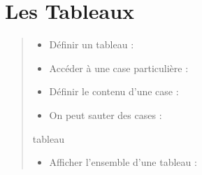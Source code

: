 \documentclass[letterpaper,10pt,french]{sphinxmanual}
\begin{document}
\section{Les Tableaux}
\label{\detokenize{21-scripts-shell:les-tableaux}}\begin{quote}
\begin{itemize}
\item {} \begin{description}
\item[{Définir un tableau :}] \leavevmode
{}

\end{description}

\item {} \begin{description}
\item[{Accéder à une case particulière :}] \leavevmode
{}

\end{description}

\item {} \begin{description}
\item[{Définir le contenu d’une case :}] \leavevmode
{}

\end{description}

\item {} 
On peut sauter des cases :

\end{itemize}

%
\begin{sphinxVerbatim}[commandchars=\\\{\}]
  
tableau\PYG{o}{[}\PYG{o}{]}
 
\end{sphinxVerbatim}
\begin{itemize}
\item {} \begin{description}
\item[{Afficher l’ensemble d’une tableau :}] \leavevmode
{}

\end{description}

\end{itemize}
\end{quote}
\end{document}
